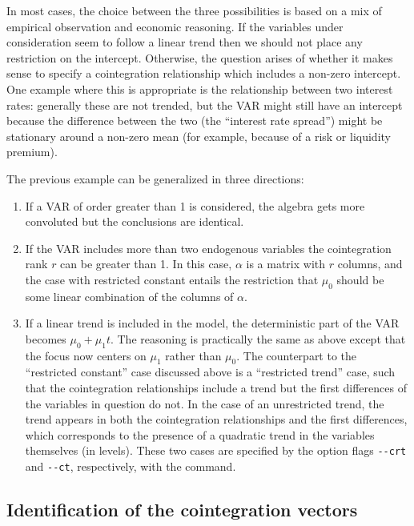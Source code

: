 In most cases, the choice between the three possibilities is based on
a mix of empirical observation and economic reasoning. If the
variables under consideration seem to follow a linear trend then we
should not place any restriction on the intercept. Otherwise, the
question arises of whether it makes sense to specify a cointegration
relationship which includes a non-zero intercept. One example where
this is appropriate is the relationship between two interest rates:
generally these are not trended, but the VAR might still have an
intercept because the difference between the two (the ``interest rate
spread'') might be stationary around a non-zero mean (for example,
because of a risk or liquidity premium).
    
The previous example can be generalized in three directions:
    
\begin{enumerate}
\item If a VAR of order greater than 1 is considered, the algebra gets
  more convoluted but the conclusions are identical.
\item If the VAR includes more than two endogenous variables the
  cointegration rank $r$ can be greater than 1. In this case, $\alpha$
  is a matrix with $r$ columns, and the case with restricted constant
  entails the restriction that $\mu_0$ should be some
  linear combination of the columns of $\alpha$.
\item If a linear trend is included in the model, the deterministic
  part of the VAR becomes $\mu_0 + \mu_1 t$. The reasoning is
  practically the same as above except that the focus now centers on
  $\mu_1$ rather than $\mu_0$.  The counterpart to the ``restricted
  constant'' case discussed above is a ``restricted trend'' case, such
  that the cointegration relationships include a trend but the first
  differences of the variables in question do not.  In the case of an
  unrestricted trend, the trend appears in both the cointegration
  relationships and the first differences, which corresponds to the
  presence of a quadratic trend in the variables themselves (in
  levels).  These two cases are specified by the option flags
  \verb+--crt+ and \verb+--ct+, respectively, with the 
  command.
\end{enumerate}

\subsection{Identification of the cointegration vectors}
\label{sec:johansen-ident}

